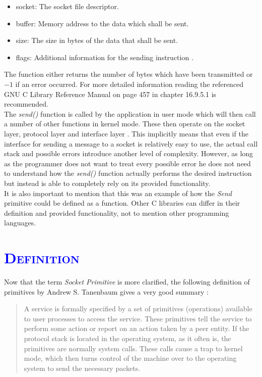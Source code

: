 \documentclass[xcolor=dvipsnames]{article}
\begin{document}
\begin{itemize}
\item socket: The socket file descriptor.
\item buffer: Memory address to the data which shall be sent.
\item size: The size in bytes of the data that shall be sent.
\item flags: Additional information for the sending instruction \cite[p. 459, ch. 16.9.5.3]{GNU_C_library_manual}.
\end{itemize}

\noindent The function either returns the number of bytes which have been transmitted or $-1$ if an error occurred. For more detailed information reading the referenced GNU C Library Reference Manual \cite{GNU_C_library_manual} on page 457 in chapter 16.9.5.1 is recommended.\\

\noindent The \textit{send()} function is called by the application in user mode which will then call a number of other functions in kernel mode. These then operate on the socket layer, protocol layer and interface layer \cite[p. 2, 16]{IBM_Anupama}. This implicitly means that even if the interface for sending a message to a socket is relatively easy to use, the actual call stack and possible errors introduce another level of complexity. However, as long as the programmer does not want to treat every possible error he does not need to understand how the \textit{send()} function actually performs the desired instruction but instead is able to completely rely on its provided functionality.\\

\noindent It is also important to mention that this was an example of how the \textit{Send} primitive could be defined as a function. Other C libraries can differ in their definition and provided functionality, not to mention other programming languages.

\section{\scshape{\textcolor{blue}{Definition}}} \label{definition}

Now that the term \textit{Socket Primitive} is more clarified, the following definition of primitives by Andrew S. Tanenbaum gives a very good summary \cite[p. 38, ch. 1.3.4]{computer_networks}:

\begin{quote}
A service is formally specified by a set of primitives (operations) available to user processes to access the service. These primitives tell the service to perform some action or report on an action taken by a peer entity. If the protocol stack is located in the operating system, as it often is, the primitives are normally system calls. These calls cause a trap to kernel mode, which then turns control of the machine over to the operating system to send the necessary packets.
\end{quote}
\end{document}
